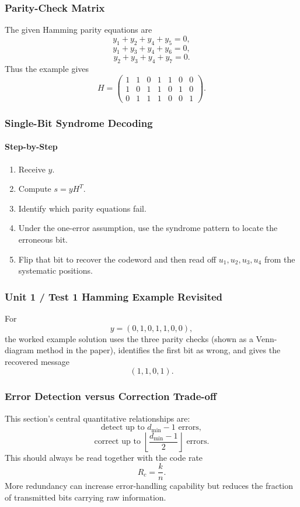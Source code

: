 \documentclass[12pt]{article}
\newcommand{\Step}{\paragraph{Step-by-Step}}
\begin{document}
\subsubsection{Parity-Check Matrix}
The given Hamming parity equations are
\[
y_1+y_2+y_4+y_5=0,
\]
\[
y_1+y_3+y_4+y_6=0,
\]
\[
y_2+y_3+y_4+y_7=0.
\]
Thus the example gives
\[
H=
\begin{pmatrix}
1&1&0&1&1&0&0\\
1&0&1&1&0&1&0\\
0&1&1&1&0&0&1
\end{pmatrix}.
\]

\subsubsection{Single-Bit Syndrome Decoding}
\Step
\begin{enumerate}
    \item Receive $y$.
    \item Compute $s=yH^T$.
    \item Identify which parity equations fail.
    \item Under the one-error assumption, use the syndrome pattern to locate the erroneous bit.
    \item Flip that bit to recover the codeword and then read off $u_1,u_2,u_3,u_4$ from the systematic positions.
\end{enumerate}

\subsubsection{Unit 1 / Test 1 Hamming Example Revisited}
For
\[
y=(0,1,0,1,1,0,0),
\]
the worked example solution uses the three parity checks (shown as a Venn-diagram method in the paper), identifies the first bit as wrong, and gives the recovered message
\[
(1,1,0,1).
\]

\subsubsection{Error Detection versus Correction Trade-off}
This section's central quantitative relationships are:
\[
\text{detect up to }d_{\min}-1\text{ errors},
\]
\[
\text{correct up to }\left\lfloor\frac{d_{\min}-1}{2}\right\rfloor\text{ errors}.
\]
This should always be read together with the code rate
\[
R_c=\frac{k}{n}.
\]
More redundancy can increase error-handling capability but reduces the fraction of transmitted bits carrying raw information.
\end{document}
